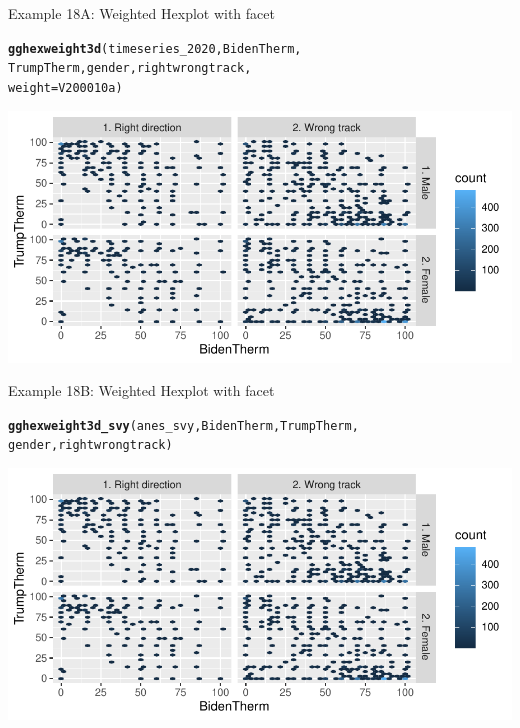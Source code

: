 \documentclass{beamer}\usepackage[]{graphicx}\usepackage[]{color}
\makeatletter
\newcommand{\hlstd}[1]{\textcolor[rgb]{0.345,0.345,0.345}{#1}}%
\newcommand{\hlkwc}[1]{\textcolor[rgb]{0.333,0.667,0.333}{#1}}%
\newcommand{\hlkwd}[1]{\textcolor[rgb]{0.737,0.353,0.396}{\textbf{#1}}}%
\newenvironment{kframe}{%
 \def\at@end@of@kframe{}%
 \ifinner\ifhmode%
  \def\at@end@of@kframe{\end{minipage}}%
  \begin{minipage}{\columnwidth}%
 \fi\fi%
 \def\FrameCommand##1{\hskip\@totalleftmargin \hskip-\fboxsep
 \colorbox{shadecolor}{##1}\hskip-\fboxsep
     \hskip-\linewidth \hskip-\@totalleftmargin \hskip\columnwidth}%
 \MakeFramed {\advance\hsize-\width
   \@totalleftmargin\z@ \linewidth\hsize
   \@setminipage}}%
 {\par\unskip\endMakeFramed%
 \at@end@of@kframe}
\newenvironment{knitrout}{}{} %
\makeatother
\begin{document}
\begin{frame}[fragile]{Example 18A: Weighted Hexplot with facet}
\begin{knitrout}
\color{fgcolor}\begin{kframe}
\begin{alltt}
\hlkwd{gghexweight3d}\hlstd{(timeseries_2020, BidenTherm,}
    \hlstd{TrumpTherm, gender, rightwrongtrack,}
    \hlkwc{weight} \hlstd{= V200010a)}
\end{alltt}
\end{kframe}
\includegraphics[width=0.95\linewidth]{figure/unnamed-chunk-67-1} 
\end{knitrout}

\end{frame}


\begin{frame}[fragile]{Example 18B: Weighted Hexplot with facet}

\begin{knitrout}
\color{fgcolor}\begin{kframe}
\begin{alltt}
\hlkwd{gghexweight3d_svy}\hlstd{(anes_svy, BidenTherm, TrumpTherm,}
    \hlstd{gender, rightwrongtrack)}
\end{alltt}
\end{kframe}
\includegraphics[width=0.95\linewidth]{figure/unnamed-chunk-68-1} 
\end{knitrout}

\end{frame}
\end{document}

